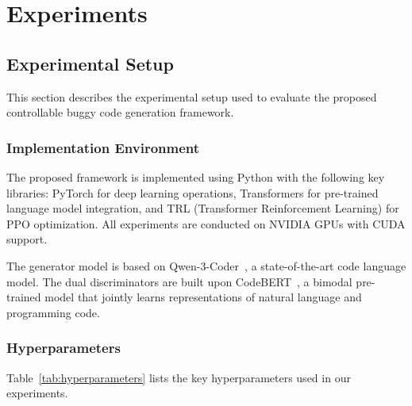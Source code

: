 \chapter{Experiments}
\begingroup
\justifying
\setlength{\parindent}{0pt}
\setlength{\parskip}{0.5\baselineskip}
\titlespacing{\chapter}{0pt}{0pt}{0pt}
\titlespacing{\section}{0pt}{0pt}{0pt}

\section{Experimental Setup}

This section describes the experimental setup used to evaluate the proposed controllable buggy code generation framework.

\subsection{Implementation Environment}

The proposed framework is implemented using Python with the following key libraries: PyTorch for deep learning operations, Transformers for pre-trained language model integration, and TRL (Transformer Reinforcement Learning) for PPO optimization. All experiments are conducted on NVIDIA GPUs with CUDA support.

The generator model is based on Qwen-3-Coder~\cite{cao2026qwen3codernexttechnicalreport}, a state-of-the-art code language model. The dual discriminators are built upon CodeBERT~\cite{feng2020codebertpretrainedmodelprogramming}, a bimodal pre-trained model that jointly learns representations of natural language and programming code.

\subsection{Hyperparameters}

Table~\ref{tab:hyperparameters} lists the key hyperparameters used in our experiments.

